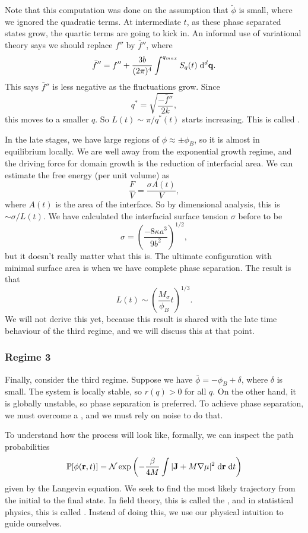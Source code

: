 \documentclass[a4paper]{article}
\begin{document}
Note that this computation was done on the assumption that $\tilde{\phi}$ is small, where we ignored the quadratic terms. At intermediate $t$, as these phase separated states grow, the quartic terms are going to kick in. An informal use of variational theory says we should replace $f''$ by $\bar{f}''$, where
\[
  \bar{f}'' = f'' + \frac{3b}{(2\pi)^4} \int^{q_{max}} S_q(t) \;\mathrm{d}^d \mathbf{q}.
\]
This says $\bar{f}''$ is less negative as the fluctuations grow. Since
\[
  q^* = \sqrt{\frac{-\bar{f}''}{2k}},
\]
this moves to a smaller $q$. So $L(t) \sim \pi/q^*(t)$ starts increasing. This is called .

In the late stages, we have large regions of $\phi \approx \pm \phi_B$, so it is almost in equilibrium locally. We are well away from the exponential growth regime, and the driving force for domain growth is the reduction of interfacial area. We can estimate the free energy (per unit volume) as
\[
  \frac{F}{V} = \frac{\sigma A(t)}{V},
\]
where $A(t)$ is the area of the interface. So by dimensional analysis, this is $\sim \sigma/L(t)$. We have calculated the interfacial surface tension $\sigma$ before to be
\[
  \sigma = \left(\frac{-8\kappa a^3}{9b^2}\right)^{1/2},
\]
but it doesn't really matter what this is. The ultimate configuration with minimal surface area is when we have complete phase separation. The result is that
\[
  L(t) \sim \left(\frac{M_\sigma}{\phi_B} t\right)^{1/3}.
\]
We will not derive this yet, because this result is shared with the late time behaviour of the third regime, and we will discuss this at that point.

\subsubsection*{Regime 3}
Finally, consider the third regime. Suppose we have $\bar{\phi} = -\phi_B + \delta$, where $\delta$ is small. The system is locally stable, so $r(q) > 0$ for all $q$. On the other hand, it is globally unstable, so phase separation is preferred. To achieve phase separation, we must overcome a , and we must rely on noise to do that.

To understand how the process will look like, formally, we can inspect the path probabilities
\[
  \mathbb{P}[\phi(\mathbf{r}, t)] = \mathcal{N} \exp \left(-\frac{\beta}{4M} \int |\mathbf{J} + M \nabla \mu|^2 \;\mathrm{d} \mathbf{r} \;\mathrm{d} t\right)
\]
given by the Langevin equation. We seek to find the most likely trajectory from the initial to the final state. In field theory, this is called the , and in statistical physics, this is called . Instead of doing this, we use our physical intuition to guide ourselves.
\end{document}
